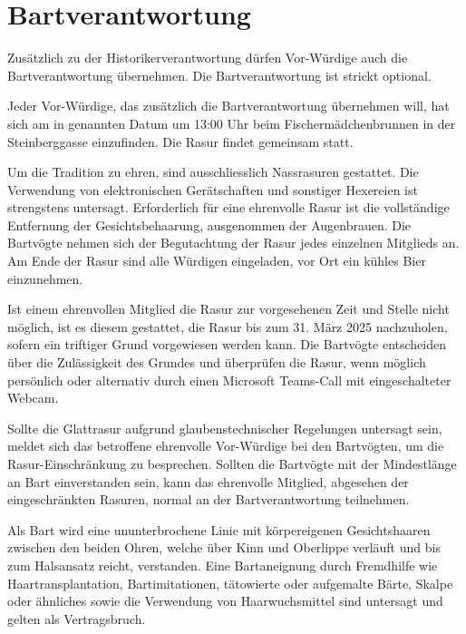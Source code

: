 \documentclass[fontsize=12pt,parskip=half]{scrartcl}
\begin{document}
\section{Bartverantwortung}
\begin{contract}
  \Clause[title={Bartverantwortung}]\label{B.verantwortung}
  Zusätzlich zu der Historikerverantwortung  dürfen Vor-Würdige auch die Bartverantwortung übernehmen. Die Bartverantwortung ist
  strickt optional.

  \Clause[title={Letzte Rasur}]\label{B.lastrasur}
  Jeder Vor-Würdige, das zusätzlich die Bartverantwortung übernehmen will, hat sich am in  genannten Datum um 13:00 Uhr
  beim Fischermädchenbrunnen in der Steinberggasse einzufinden.
  Die Rasur findet gemeinsam statt.

  \SubClause[title={Durchführung der Rasur}]\label{B.durchfuehrung}
  Um die Tradition zu ehren, sind ausschliesslich Nassrasuren gestattet. Die Verwendung von
  elektronischen Gerätschaften und sonstiger Hexereien ist strengstens untersagt. Erforderlich für eine
  ehrenvolle Rasur ist die vollständige Entfernung der Gesichtsbehaarung, ausgenommen der
  Augenbrauen. Die Bartvögte nehmen sich der Begutachtung der Rasur jedes einzelnen Mitglieds
  an.
  \SubClause[title={Anschliessende Kehlenbefeuchtung}]
  Am Ende der Rasur sind alle Würdigen eingeladen, vor Ort ein kühles Bier einzunehmen.

  \SubClause[title={Rasurverzug}]
  Ist einem ehrenvollen Mitglied die Rasur zur vorgesehenen Zeit und Stelle nicht möglich,
  ist es diesem gestattet, die Rasur bis zum 31. März 2025 nachzuholen, sofern ein triftiger
  Grund vorgewiesen werden kann. Die Bartvögte entscheiden über die Zulässigkeit des Grundes
  und überprüfen die Rasur, wenn möglich persönlich oder alternativ durch einen
  Microsoft Teams-Call mit eingeschalteter Webcam.

  \SubClause[title={Glaubensklausel (Shamess Klausel)}]
  Sollte die Glattrasur aufgrund glaubenstechnischer Regelungen untersagt sein, meldet sich
  das betroffene ehrenvolle Vor-Würdige bei den Bartvögten, um die Rasur-Einschränkung zu
  besprechen. Sollten die Bartvögte mit der Mindestlänge an Bart einverstanden sein,
  kann das ehrenvolle Mitglied, abgesehen der eingeschränkten Rasuren, normal
  an der Bartverantwortung teilnehmen.

  \Clause[title={Bartvorschriften}]
  \SubClause[title={Definition Bart}]
  Als Bart wird eine ununterbrochene Linie mit körpereigenen Gesichtshaaren zwischen den beiden Ohren,
  welche über Kinn und Oberlippe verläuft und bis zum Halsansatz reicht, verstanden. Eine Bartaneignung
  durch Fremdhilfe wie Haartransplantation, Bartimitationen, tätowierte oder aufgemalte Bärte,
  Skalpe oder ähnliches sowie die Verwendung von Haarwuchsmittel sind untersagt und gelten als Vertragsbruch.


\end{contract}
\end{document}
